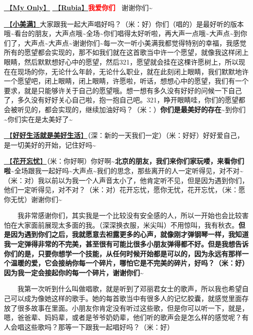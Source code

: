 \documentclass[]{ctexbook}
\begin{document}
\hyperref[my-only]{🎵【\textbf{My Only}】} \hyperref[rubia]{🎵【\textbf{Rubia}】}\textbf{\textcolor{red}{我爱你们~} } 谢谢你们\textasciitilde{}

\hyperref[happy-ending]{🎵【\textbf{小美满}】}大家跟我一起大声唱好吗？（米：好）你们（唱的）是最好听的版本哦\textasciitilde 看台的朋友，大声点哦\textasciitilde 全场\textasciitilde 你们唱得太好听啦，再大声一点哦\textasciitilde 大声点\textasciitilde 到你们了，大声点\textasciitilde 大声点\textasciitilde 谢谢你们\textasciitilde 每一次一听小美满我都觉得特别的幸福，我感觉所有的愿望都会实现的，那不如我们就在这首歌当中许一个愿望，就像我这样闭上眼睛，然后默默想好心中的愿望，然后321，愿望就会挂在这棵许愿树上，所以现在在现场的你，无论什么年龄，无论什么职业，就在此刻闭上眼睛，我们默默地许一个愿望吧，闭上眼睛，闭上眼睛，许愿啦，听话，想想心中的愿望，我们有一个要求，就是只能够许关于自己的愿望哦。想一想有多久没有好好的问候一下自己了，多久没有好好关心自己啦，抱一抱自己吧。321，睁开眼睛哇，你们的愿望都会被听见的，都会实现的，继续加油好吗？（米：）\textbf{你们是最美好的存在\textasciitilde{}}到你们\textasciitilde 你们实在是太美好了\textasciitilde{}

\hyperref[live-happy-life-happy]{🎵【\textbf{好好生活就是美好生活}】}（深：新的一天我们一定）（米：好好）好好爱自己，是一切美好的开始，记住好吗\textasciitilde{}

\hyperref[no-worries]{🎵【\textbf{花开忘忧}】}（米：你好啊）你好啊\textasciitilde{}\textbf{北京的朋友，我们来你们家玩喽，来看你们啦\textasciitilde{}}全场跟我一起好吗\textasciitilde 大声点\textasciitilde 我们的思念，那些离开的人一定听得见，对不对\textasciitilde（米：对）我以前以为我一个人声音太小了，他肯定听不见，但是因为遇到你们，他们一定听得见，对不对？（米：对）花开忘忧，愿你无忧，花开忘忧，（米：愿你无忧）谢谢你们\textasciitilde{}

  我非常感谢你们，其实我是一个比较没有安全感的人，所以一开始也会比较害怕在大家面前展现太多面的我。（深深换衣服，米尖叫）不用惊叫，我有秋衣。\textbf{但是因为遇到你们之后，我就愿意去袒露更多的心声，就像刚才弹钢琴一样，我知道我一定弹得非常的不完美，甚至很有可能比很多小朋友弹得都不好。但是我想告诉你们的是，只要你想学一个技能，从任何时候开始都是可以的，因为永远有那样一个温暖的爱，它会接纳你每一个碎片，哪怕它是不完美的碎片，好吗？（米：好）因为我一定会接起你的每一个碎片，谢谢你们\textasciitilde{}}

  我第一次听到什么叫做唱歌，就是听到了邓丽君女士的歌声，所以我也希望自己可以成为像她这样的歌手。她的每首歌当中有很多人的记忆胶囊，就感觉里面存放了很多故事在里面。小朋友你肯定没有听过这些歌，但是你可以听一下，就是，嗯，爸爸辈、妈妈辈，或者是爷爷奶奶辈，他们听的歌声会是怎么样的感觉呢？有人会唱这些歌吗？那等一下跟我一起唱好吗？（米：好）
\end{document}
